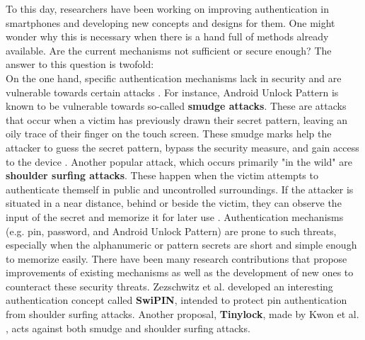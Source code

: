 To this day, researchers have been working on improving authentication in smartphones and developing new concepts and designs for them. One might wonder why this is necessary when there is a hand full of methods already available. Are the current mechanisms not sufficient or secure enough? The answer to this question is twofold:\\

On the one hand, specific authentication mechanisms lack in security and are vulnerable towards certain attacks \cite{Schloeglhofer}. For instance, Android Unlock Pattern is known to be vulnerable towards so-called \textbf{smudge attacks}. These are attacks that occur when a victim has previously drawn their secret pattern, leaving an oily trace of their finger on the touch screen. These smudge marks help the attacker to guess the secret pattern, bypass the security measure, and gain access to the device \cite{ediss20251}. Another popular attack, which occurs primarily "in the wild" are \textbf{shoulder surfing attacks}. These happen when the victim attempts to authenticate themself in public and uncontrolled surroundings. If the attacker is situated in a near distance, behind or beside the victim, they can observe the input of the secret and memorize it for later use \cite{ediss20251}. Authentication mechanisms (e.g. pin, password, and Android Unlock Pattern) are prone to such threats, especially when the alphanumeric or pattern secrets are short and simple enough to memorize easily. There have been many research contributions that propose improvements of existing mechanisms as well as the development of new ones to counteract these security threats. Zezschwitz et al. \cite{vonZezschwitz:2015:SFS:2702123.2702212} developed an interesting authentication concept called \textbf{SwiPIN}, intended to protect pin authentication from shoulder surfing attacks. Another proposal, \textbf{Tinylock}, made by Kwon et al. \cite{kwon}, acts against both smudge and shoulder surfing attacks.\\


